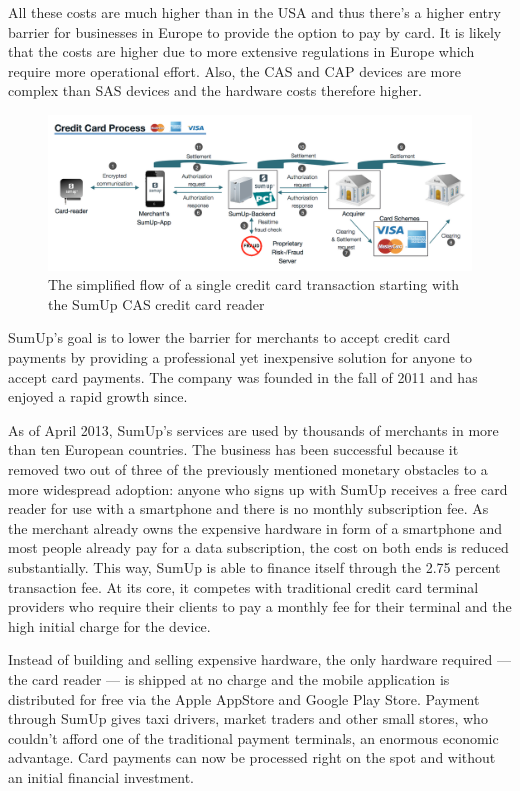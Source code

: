 \documentclass[a4paper, oneside]{csthesis}
\begin{document}
All these costs are much higher than in the USA and thus there's a higher entry barrier for businesses in Europe to provide the option to pay by card. It is likely that the costs are higher due to more extensive regulations in Europe which require more operational effort. Also, the CAS and CAP devices are more complex than SAS devices and the hardware costs therefore higher.

\begin{figure}[tb]
    \begin{center}
        \includegraphics[width=\textwidth]{figures/credit-card-flow.png}
    \end{center}
    \caption{The simplified flow of a single credit card transaction starting with the SumUp CAS credit card reader}
    \label{fig:credit-card-flow}
\end{figure}

SumUp's goal is to lower the barrier for merchants to accept credit card payments by providing a professional yet inexpensive solution for anyone to accept card payments. The company was founded in the fall of 2011 and has enjoyed a rapid growth since.

As of April 2013, SumUp's services are used by thousands of merchants in more than ten European countries.
The business has been successful because it removed two out of three of the previously mentioned monetary obstacles to a more widespread adoption: anyone who signs up with SumUp receives a free card reader for use with a smartphone and there is no monthly subscription fee. As the merchant already owns the expensive hardware in form of a smartphone and most people already pay for a data subscription, the cost on both ends is reduced substantially. This way, SumUp is able to finance itself through the 2.75 percent transaction fee. At its core, it competes with traditional credit card terminal providers who require their clients to pay a monthly fee for their terminal and the high initial charge for the device.

Instead of building and selling expensive hardware, the only hardware required --- the card reader --- is shipped at no charge and the mobile application is distributed for free via the Apple AppStore and Google Play Store.
Payment through SumUp gives taxi drivers, market traders and other small stores, who couldn't afford one of the traditional payment terminals, an enormous economic advantage. Card payments can now be processed right on the spot and without an initial financial investment.
\end{document}
